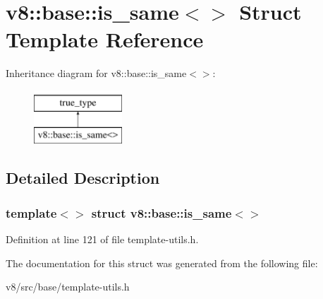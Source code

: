 \hypertarget{structv8_1_1base_1_1is__same_3_4}{}\section{v8\+:\+:base\+:\+:is\+\_\+same$<$$>$ Struct Template Reference}
\label{structv8_1_1base_1_1is__same_3_4}
Inheritance diagram for v8\+:\+:base\+:\+:is\+\_\+same$<$$>$\+:\begin{figure}[H]
\begin{center}
\leavevmode
\includegraphics[height=2.000000cm]{structv8_1_1base_1_1is__same_3_4}
\end{center}
\end{figure}


\subsection{Detailed Description}
\subsubsection*{template$<$$>$\newline
struct v8\+::base\+::is\+\_\+same$<$$>$}



Definition at line 121 of file template-\/utils.\+h.



The documentation for this struct was generated from the following file\+:\begin{DoxyCompactItemize}
\item 
v8/src/base/template-\/utils.\+h\end{DoxyCompactItemize}
